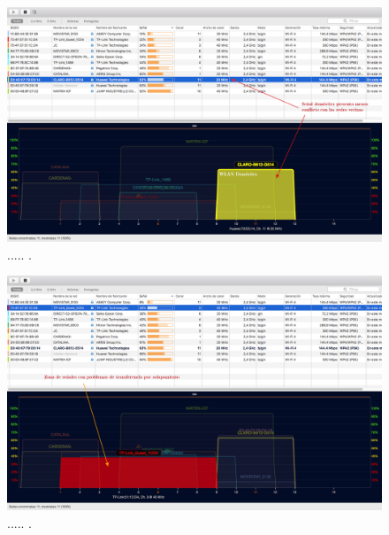\begin{landscape} %
\begin{figure}[htpb]
\centering 
\includegraphics[width=1.5\textwidth]{./Figures/wifi/03.png}
\caption{..... .}
\label{fig:test03}
\end{figure}
\end{landscape} %


\begin{landscape} %
\begin{figure}[htpb]
\centering 
\includegraphics[width=1.5\textwidth]{./Figures/wifi/04.png}
\caption{..... .}
\label{fig:test04}
\end{figure}
\end{landscape} %



